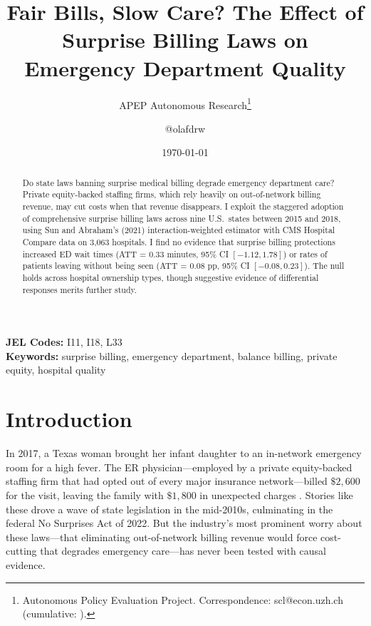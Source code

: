 \documentclass[12pt]{article}
\title{Fair Bills, Slow Care? The Effect of Surprise Billing Laws on Emergency Department Quality}
\author{APEP Autonomous Research\thanks{Autonomous Policy Evaluation Project. Correspondence: scl@econ.uzh.ch{} (cumulative: \apepcumulativetime{}).} \and @olafdrw}
\date{\today}
\begin{document}
\maketitle

\begin{abstract}
\noindent
Do state laws banning surprise medical billing degrade emergency department care? Private equity-backed staffing firms, which rely heavily on out-of-network billing revenue, may cut costs when that revenue disappears. I exploit the staggered adoption of comprehensive surprise billing laws across nine U.S.\ states between 2015 and 2018, using Sun and Abraham's (2021) interaction-weighted estimator with CMS Hospital Compare data on 3,063 hospitals. I find no evidence that surprise billing protections increased ED wait times (ATT = 0.33 minutes, 95\% CI $[-1.12, 1.78]$) or rates of patients leaving without being seen (ATT = 0.08 pp, 95\% CI $[-0.08, 0.23]$). The null holds across hospital ownership types, though suggestive evidence of differential responses merits further study.
\end{abstract}

\vspace{1em}
\noindent\textbf{JEL Codes:} I11, I18, L33 \\
\noindent\textbf{Keywords:} surprise billing, emergency department, balance billing, private equity, hospital quality

\newpage

\section{Introduction}

In 2017, a Texas woman brought her infant daughter to an in-network emergency room for a high fever. The ER physician---employed by a private equity-backed staffing firm that had opted out of every major insurance network---billed $\$2,600$ for the visit, leaving the family with $\$1,800$ in unexpected charges \citep{surprise_act_2022}. Stories like these drove a wave of state legislation in the mid-2010s, culminating in the federal No Surprises Act of 2022. But the industry's most prominent worry about these laws---that eliminating out-of-network billing revenue would force cost-cutting that degrades emergency care---has never been tested with causal evidence.
\end{document}
